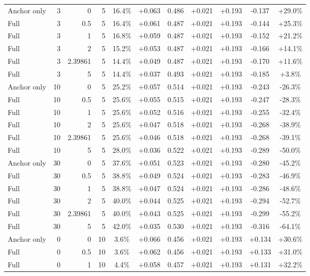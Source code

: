 \begin{table}[htbp]
\begin{tabular}{lrrrccccccc}
Anchor only & 3 & 0 & 5 & 16.4\% & +0.063 & 0.486 & +0.021 & +0.193 & -0.137 & +29.0\% \\
Full & 3 & 0.5 & 5 & 16.4\% & +0.061 & 0.487 & +0.021 & +0.193 & -0.144 & +25.3\% \\
Full & 3 & 1 & 5 & 16.8\% & +0.059 & 0.487 & +0.021 & +0.193 & -0.152 & +21.2\% \\
Full & 3 & 2 & 5 & 15.2\% & +0.053 & 0.487 & +0.021 & +0.193 & -0.166 & +14.1\% \\
Full & 3 & 2.39861 & 5 & 14.4\% & +0.049 & 0.487 & +0.021 & +0.193 & -0.170 & +11.6\% \\
Full & 3 & 5 & 5 & 14.4\% & +0.037 & 0.493 & +0.021 & +0.193 & -0.185 & +3.8\% \\
Anchor only & 10 & 0 & 5 & 25.2\% & +0.057 & 0.514 & +0.021 & +0.193 & -0.243 & -26.3\% \\
Full & 10 & 0.5 & 5 & 25.6\% & +0.055 & 0.515 & +0.021 & +0.193 & -0.247 & -28.3\% \\
Full & 10 & 1 & 5 & 25.6\% & +0.052 & 0.516 & +0.021 & +0.193 & -0.255 & -32.4\% \\
Full & 10 & 2 & 5 & 25.6\% & +0.047 & 0.518 & +0.021 & +0.193 & -0.268 & -38.9\% \\
Full & 10 & 2.39861 & 5 & 25.6\% & +0.046 & 0.518 & +0.021 & +0.193 & -0.268 & -39.1\% \\
Full & 10 & 5 & 5 & 28.0\% & +0.036 & 0.522 & +0.021 & +0.193 & -0.289 & -50.0\% \\
Anchor only & 30 & 0 & 5 & 37.6\% & +0.051 & 0.523 & +0.021 & +0.193 & -0.280 & -45.2\% \\
Full & 30 & 0.5 & 5 & 38.8\% & +0.049 & 0.524 & +0.021 & +0.193 & -0.283 & -46.9\% \\
Full & 30 & 1 & 5 & 38.8\% & +0.047 & 0.524 & +0.021 & +0.193 & -0.286 & -48.6\% \\
Full & 30 & 2 & 5 & 40.0\% & +0.044 & 0.525 & +0.021 & +0.193 & -0.294 & -52.7\% \\
Full & 30 & 2.39861 & 5 & 40.0\% & +0.043 & 0.525 & +0.021 & +0.193 & -0.299 & -55.2\% \\
Full & 30 & 5 & 5 & 42.0\% & +0.035 & 0.530 & +0.021 & +0.193 & -0.316 & -64.1\% \\
Anchor only & 0 & 0 & 10 & 3.6\% & +0.066 & 0.456 & +0.021 & +0.193 & +0.134 & +30.6\% \\
Full & 0 & 0.5 & 10 & 3.6\% & +0.062 & 0.456 & +0.021 & +0.193 & +0.133 & +31.0\% \\
Full & 0 & 1 & 10 & 4.4\% & +0.058 & 0.457 & +0.021 & +0.193 & +0.131 & +32.2\% \\

\end{tabular}
\end{table}
